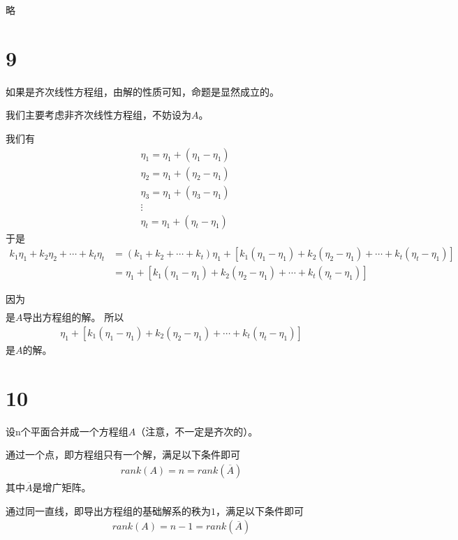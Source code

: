 \documentclass{article}
\begin{document}
略

\section*{9}

如果是齐次线性方程组，由解的性质可知，命题是显然成立的。

我们主要考虑非齐次线性方程组，不妨设为$A$。

我们有
\begin{align*}
   & \eta_1 = \eta_1 + (\eta_1 - \eta_1) \\
   & \eta_2 = \eta_1 + (\eta_2 - \eta_1) \\
   & \eta_3 = \eta_1 + (\eta_3 - \eta_1) \\
   & \vdots                              \\
   & \eta_t = \eta_1 + (\eta_t - \eta_1)
\end{align*}
于是
\begin{align*}
  k_1 \eta_1 + k_2 \eta_2 + \cdots + k_t \eta_t
   & = (k_1 + k_2 + \cdots + k_t) \eta_1 + [k_1(\eta_1 - \eta_1) + k_2(\eta_2 - \eta_1) + \cdots + k_t(\eta_t - \eta_1)] \\
   & = \eta_1 + [k_1(\eta_1 - \eta_1) + k_2(\eta_2 - \eta_1) + \cdots + k_t(\eta_t - \eta_1)]
\end{align*}

因为
\begin{align*}
  [k_1(\eta_1 - \eta_1) + k_2(\eta_2 - \eta_1) + \cdots + k_t(\eta_t - \eta_1)]
\end{align*}
是$A$导出方程组的解。
所以
\begin{align*}
  \eta_1 + [k_1(\eta_1 - \eta_1) + k_2(\eta_2 - \eta_1) + \cdots + k_t(\eta_t - \eta_1)]
\end{align*}
是$A$的解。

\section*{10}

设n个平面合并成一个方程组$A$（注意，不一定是齐次的）。

通过一个点，即方程组只有一个解，满足以下条件即可
\begin{align*}
  rank(A) = n = rank(\overline{A})
\end{align*}
其中$\overline{A}$是增广矩阵。

通过同一直线，即导出方程组的基础解系的秩为$1$，满足以下条件即可
\begin{align*}
  rank(A) = n - 1 = rank(\overline{A})
\end{align*}
\end{document}
